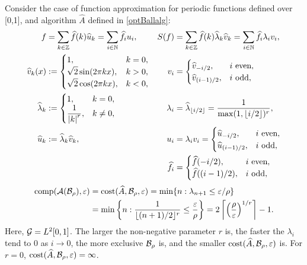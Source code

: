 \documentclass[graybox,footinfo]{svmult}
\newcommand{\DHJRabs}[1]{\ensuremath{{\left \lvert #1 \right \rvert}}}
\begin{document}
\begin{example} Consider the case of function approximation for periodic functions defined over [0,1], and algorithm $\widehat{A}$ defined in \eqref{optBallalg}:
	\begin{align*}
	f &= \sum_{k \in \bbZ} \widehat{f}(k) \widehat{u}_{k}  = \sum_{i \in \bbN} \widehat{f}_i u_i, 
	& S(f) & = \sum_{k \in \bbZ} \widehat{f}(k) \widehat{\lambda}_k \widehat{v}_k = \sum_{i \in \bbN} \widehat{f}_i \lambda_i v_i, \\
	\widehat{v}_{k} (x) &:= \begin{cases} 1, & k = 0, \\
	\displaystyle \sqrt{2} \sin(2\pi k x), & k > 0, \\
	\displaystyle \sqrt{2} \cos(2\pi k x), & k < 0, \\
	\end{cases} 
	& v_i &= \begin{cases} \widehat{v}_{-i/2}, & i \text{ even},\\
	\widehat{v}_{(i-1)/2}, & i \text{ odd},
	\end{cases} \\
	\widehat{\lambda}_{k} &:= \begin{cases} 1, & k = 0, \\
	\displaystyle \frac{1}{\DHJRabs{k}^r}, & k \ne 0,
	\end{cases}
	& \lambda_i &= \widehat{\lambda}_{\lfloor i/2\rfloor} = \frac{1}{\max(1,\lfloor i/2\rfloor)^r}, \\
	\widehat{u}_{k} &:=  \widehat{\lambda}_k \widehat{v}_k,
	& u_i & = \lambda_i v_i = \begin{cases} \widehat{u}_{-i/2}, & i \text{ even},\\
	\widehat{u}_{(i-1)/2}, & i \text{ odd},
	\end{cases}
	\\
	&&\widehat{f}_i& = \begin{cases} \widehat{f}(-i/2), & i \text{ even},\\
	\widehat{f}((i-1)/2), & i \text{ odd},
	\end{cases}
	\end{align*}
	\begin{align*}
	\textup{comp}({\mathcal{A}}({\mathcal{B}}_{\rho}),\varepsilon) &= \textup{cost}(\widehat{A},{\mathcal{B}}_{\rho},\varepsilon) 
	=\min\{ n : \lambda_{n+1} \le \varepsilon/\rho \} \\
	& = \min \left\{ n : \frac{1}{\lfloor (n+1)/2 \rfloor^r} \le \frac{\varepsilon}{\rho} \right\} 
	= 2 \left \lceil \left(\frac{\rho}{\varepsilon} \right)^{1/r} \right \rceil - 1.
	\end{align*}
	Here, ${\mathcal{G}}=L^2[0,1]$.  The larger the non-negative parameter $r$ is, the faster the $\lambda_i$ tend to 0 as $ i \to 0$, the more exclusive ${\mathcal{B}}_\rho$ is, and the smaller  $\textup{cost}(\widehat{A},{\mathcal{B}}_{\rho},\varepsilon)$ is.  For $r = 0$, $\textup{cost}(\widehat{A},{\mathcal{B}}_{\rho},\varepsilon) = \infty$.
\end{example}
\end{document}
